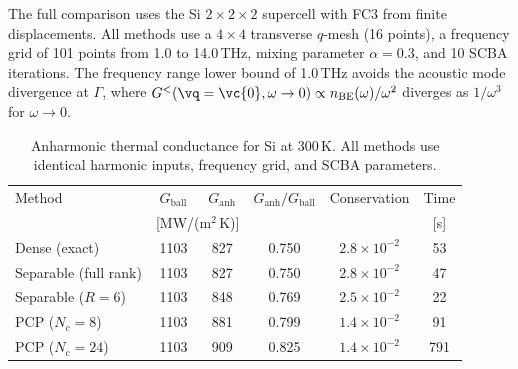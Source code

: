 The full comparison uses the Si $2\times2\times2$ supercell with FC3
from finite displacements.  All methods use a $4\times4$ transverse
$q$-mesh (16 points), a frequency grid of 101 points from 1.0 to
14.0\,THz, mixing parameter $\alpha = 0.3$, and 10 SCBA iterations.
The frequency range lower bound of 1.0\,THz avoids the acoustic mode
divergence at $\Gamma$, where
$G^<(\vq = \vc{0}, \omega \to 0) \propto n_\mathrm{BE}(\omega)/\omega^2$
diverges as $1/\omega^3$ for $\omega \to 0$.

\begin{table}[h]
\centering
\caption{Anharmonic thermal conductance for Si at 300\,K.  All methods
use identical harmonic inputs, frequency grid, and SCBA parameters.}
\label{tab:method_comparison}
\begin{tabular}{lccccc}
  \toprule
  Method & $G_\mathrm{ball}$ & $G_\mathrm{anh}$
    & $G_\mathrm{anh}/G_\mathrm{ball}$ & Conservation & Time \\
  & \multicolumn{2}{c}{[MW/(m$^2$\,K)]} & & & [s] \\
  \midrule
  Dense (exact)           & 1103 & 827 & 0.750 & $2.8\times10^{-2}$ & 53 \\
  Separable (full rank)   & 1103 & 827 & 0.750 & $2.8\times10^{-2}$ & 47 \\
  Separable ($R=6$)       & 1103 & 848 & 0.769 & $2.5\times10^{-2}$ & 22 \\
  PCP ($N_c = 8$)         & 1103 & 881 & 0.799 & $1.4\times10^{-2}$ & 91 \\
  PCP ($N_c = 24$)        & 1103 & 909 & 0.825 & $1.4\times10^{-2}$ & 791 \\
  \bottomrule
\end{tabular}
\end{table}

